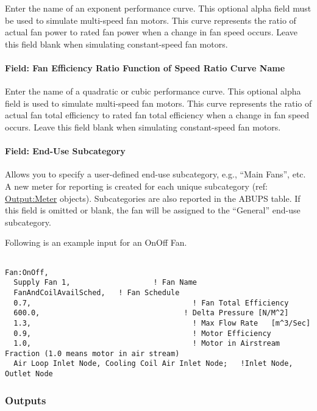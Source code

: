 Enter the name of an exponent performance curve. This optional alpha field must be used to simulate multi-speed fan motors. This curve represents the ratio of actual fan power to rated fan power when a change in fan speed occurs. Leave this field blank when simulating constant-speed fan motors.

\paragraph{Field: Fan Efficiency Ratio Function of Speed Ratio Curve Name}\label{field-fan-efficiency-ratio-function-of-speed-ratio-curve-name}

Enter the name of a quadratic or cubic performance curve. This optional alpha field is used to simulate multi-speed fan motors. This curve represents the ratio of actual fan total efficiency to rated fan total efficiency when a change in fan speed occurs. Leave this field blank when simulating constant-speed fan motors.

\paragraph{Field: End-Use Subcategory}\label{field-end-use-subcategory-1-000}

Allows you to specify a user-defined end-use subcategory, e.g., ``Main Fans'', etc. A new meter for reporting is created for each unique subcategory (ref: \hyperref[outputmeter-and-outputmetermeterfileonly]{Output:Meter} objects). Subcategories are also reported in the ABUPS table. If this field is omitted or blank, the fan will be assigned to the ``General'' end-use subcategory.

Following is an example input for an OnOff Fan.

\begin{lstlisting}

Fan:OnOff,
  Supply Fan 1,                   ! Fan Name
  FanAndCoilAvailSched,   ! Fan Schedule
  0.7,                                     ! Fan Total Efficiency
  600.0,                                 ! Delta Pressure [N/M^2]
  1.3,                                     ! Max Flow Rate   [m^3/Sec]
  0.9,                                     ! Motor Efficiency
  1.0,                                     ! Motor in Airstream Fraction (1.0 means motor in air stream)
  Air Loop Inlet Node, Cooling Coil Air Inlet Node;   !Inlet Node, Outlet Node
\end{lstlisting}

\subsubsection{Outputs}\label{outputs-1-011}

